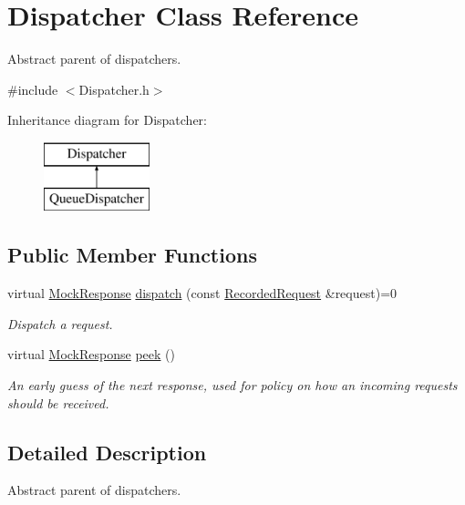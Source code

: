 \hypertarget{class_dispatcher}{\section{Dispatcher Class Reference}
\label{class_dispatcher}
}


Abstract parent of dispatchers.  




{\ttfamily \#include $<$Dispatcher.\+h$>$}

Inheritance diagram for Dispatcher\+:\begin{figure}[H]
\begin{center}
\leavevmode
\includegraphics[height=2.000000cm]{class_dispatcher}
\end{center}
\end{figure}
\subsection*{Public Member Functions}
\begin{DoxyCompactItemize}
\item 
virtual \hyperlink{class_mock_response}{Mock\+Response} \hyperlink{class_dispatcher_acbbf8d0ca649be337d805dcbaf4ba81b}{dispatch} (const \hyperlink{class_recorded_request}{Recorded\+Request} \&request)=0
\begin{DoxyCompactList}\small\item\em Dispatch a request. \end{DoxyCompactList}\item 
virtual \hyperlink{class_mock_response}{Mock\+Response} \hyperlink{class_dispatcher_af4768d8abe65389a5cdbb48499c32a0f}{peek} ()
\begin{DoxyCompactList}\small\item\em An early guess of the next response, used for policy on how an incoming requests should be received. \end{DoxyCompactList}\end{DoxyCompactItemize}


\subsection{Detailed Description}
Abstract parent of dispatchers. 

